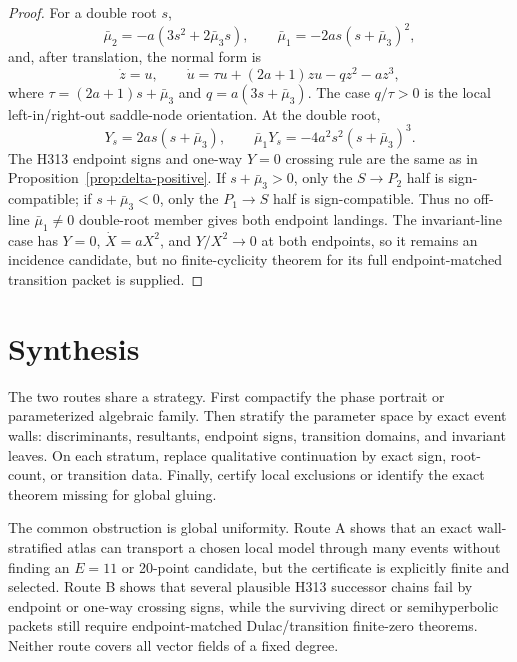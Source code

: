 \documentclass[11pt]{article}
\begin{document}
\begin{proof}
For a double root \(s\),
\[
\bar\mu_2=-a(3s^2+2\bar\mu_3s),\qquad
\bar\mu_1=-2as(s+\bar\mu_3)^2,
\]
and, after translation, the normal form is
\[
  \dot z=u,\qquad
  \dot u=\tau u+(2a+1)zu-qz^2-az^3,
\]
where \(\tau=(2a+1)s+\bar\mu_3\) and \(q=a(3s+\bar\mu_3)\).  The case \(q/\tau>0\) is the local left-in/right-out saddle-node orientation.  At the double root,
\[
  Y_s=2as(s+\bar\mu_3),\qquad
  \bar\mu_1Y_s=-4a^2s^2(s+\bar\mu_3)^3.
\]
The H313 endpoint signs and one-way \(Y=0\) crossing rule are the same as in Proposition~\ref{prop:delta-positive}.  If \(s+\bar\mu_3>0\), only the \(S\to P_2\) half is sign-compatible; if \(s+\bar\mu_3<0\), only the \(P_1\to S\) half is sign-compatible.  Thus no off-line \(\bar\mu_1\ne0\) double-root member gives both endpoint landings.  The invariant-line case has \(Y=0\), \(\dot X=aX^2\), and \(Y/X^2\to0\) at both endpoints, so it remains an incidence candidate, but no finite-cyclicity theorem for its full endpoint-matched transition packet is supplied.
\end{proof}

\section{Synthesis}
The two routes share a strategy.  First compactify the phase portrait or parameterized algebraic family.  Then stratify the parameter space by exact event walls: discriminants, resultants, endpoint signs, transition domains, and invariant leaves.  On each stratum, replace qualitative continuation by exact sign, root-count, or transition data.  Finally, certify local exclusions or identify the exact theorem missing for global gluing.

The common obstruction is global uniformity.  Route A shows that an exact wall-stratified atlas can transport a chosen local model through many events without finding an \(E=11\) or 20-point candidate, but the certificate is explicitly finite and selected.  Route B shows that several plausible H313 successor chains fail by endpoint or one-way crossing signs, while the surviving direct or semihyperbolic packets still require endpoint-matched Dulac/transition finite-zero theorems.  Neither route covers all vector fields of a fixed degree.
\end{document}
